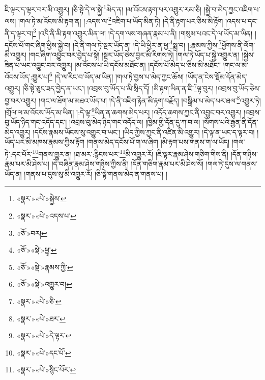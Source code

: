 ཇི་ལྟར་ད་ལྟར་བར་མི་འགྱུར། །ཅི་སྟེ་དེ་ལ་སྐྱེ་\footnote{«སྣར་»«པེ་»སྐྱེས་}མེད་ན། །མ་འོངས་རྟག་པར་འགྱུར་རམ་ཅི། །སྐྱེ་བ་མེད་ཀྱང་འཇིག་པ་ལས། །གལ་ཏེ་མ་འོངས་མི་རྟག་ན། །:འདས་ལ་\footnote{«སྣར་»«པེ་»འདས་པ་}འཇིག་པ་ཡོད་མིན་ཏེ། །དེ་ནི་རྟག་པར་ཅིས་མི་རྟོག །འདས་པ་དང་ནི་ད་ལྟར་བ།\footnote{«ཅོ་»བར།} །འདི་ནི་མི་རྟག་འགྱུར་མིན་ལ། །དེ་དག་ལས་གཞན་རྣམ་པ་ནི། །གསུམ་པའང་དེ་ལ་ཡོད་མ་ཡིན། །དངོས་པོ་གང་ཞིག་ཕྱིས་སྐྱེ་བ། །དེ་ནི་གལ་ཏེ་སྔར་ཡོད་ན། །དེ་ཡི་ཕྱིར་ན་ཕྱ་\footnote{«ཅོ་»«སྡེ་»ཕྱྭ་}སྨྲ་བ། །:རྣམས་ཀྱིས་\footnote{«ཅོ་»«སྡེ་»རྣམས་ཀྱི་}ཕྱོགས་ནི་ལོག་མི་འགྱུར། །གང་ཞིག་འབྱུང་བར་བྱེད་པ་སྟེ། །སྔར་ཡོད་ཅེས་བྱར་མི་རིགས་ཏེ། །གལ་ཏེ་ཡོད་པ་སྐྱེ་འགྱུར་ན། །སྐྱེས་ཟིན་པ་ཡང་འབྱུང་བར་འགྱུར། །མ་འོངས་པ་ཡི་དངོས་མཐོང་ན། །དངོས་པོ་མེད་པ་ཅིས་མི་མཐོང་། །གང་ལ་མ་འོངས་ཡོད་:གྱུར་པ།\footnote{«ཅོ་»«སྡེ་»འགྱུར་བ།} །དེ་ལ་རིང་བ་ཡོད་མ་ཡིན། །གལ་ཏེ་བྱས་པ་མེད་ཀྱང་ཆོས། །ཡོད་ན་ངེས་སྡོམ་དོན་མེད་འགྱུར། །ཅི་སྟེ་ཅུང་ཟད་བྱེད་ན་ཡང་། །འབྲས་བུ་ཡོད་པ་མི་སྲིད་དོ། །མི་རྟག་ཡིན་ན་ཇི་\footnote{«སྣར་»«པེ་»ཅི་}ལྟ་བུར། །འབྲས་བུ་ཡོད་ཅེས་བྱ་བར་འགྱུར། །གང་ལ་ཐོག་མ་མཐའ་ཡོད་པ། །དེ་ནི་འཇིག་རྟེན་མི་རྟག་བརྗོད། །བསྒྲིམ་པ་མེད་པར་ཐལ་\footnote{«སྣར་»«པེ་»ཐར་}འགྱུར་ཏེ། །གྲོལ་ལ་མ་འོངས་ཡོད་མ་ཡིན། །:དེ་ལྟ་\footnote{«སྣར་»«པེ་»དེ་ལྟར་}ཡིན་ན་ཆགས་མེད་པར། །འདོད་ཆགས་ཀྱང་ནི་འབྱུང་བར་འགྱུར། །འབྲས་བུ་ཡོད་ཉིད་གང་འདོད་དང་། །འབྲས་བུ་མེད་ཉིད་གང་འདོད་ལ། །ཁྱིམ་གྱི་དོན་དུ་ཀ་བ་ལ། །སོགས་པའི་རྒྱན་ནི་དོན་མེད་འགྱུར། །དངོས་རྣམས་ཡོངས་སུ་འགྱུར་བ་ཡང་། །ཡིད་ཀྱིས་ཀྱང་ནི་འཛིན་མི་འགྱུར། །དེ་ལྟ་ན་ཡང་ད་ལྟར་བ། །ཡོད་པར་མི་མཁས་རྣམས་ཀྱིས་རྟོག །གནས་མེད་དངོས་པོ་ག་ལ་ཞིག །མི་རྟག་པས་གནས་ག་ལ་ཡོད། །གལ་ཏེ་:དང་པོར་\footnote{«སྣར་»«པེ་»དང་པོ་}གནས་གྱུར་ན། །ཐ་མར་:རྙིངས་པར་\footnote{«སྣར་»«པེ་»སྙིང་པོར་}མི་འགྱུར་རོ། །ཇི་ལྟར་རྣམ་ཤེས་གཅིག་གིས་ནི། །དོན་གཉིས་རྣམ་པར་མི་ཤེས་པ། །དེ་བཞིན་རྣམ་ཤེས་གཉིས་ཀྱིས་ནི། །དོན་གཅིག་རྣམ་པར་མི་ཤེས་སོ། །གལ་ཏེ་དུས་ལ་གནས་ཡོད་ན། །གནས་པ་དུས་སུ་མི་འགྱུར་རོ། །ཅི་སྟེ་གནས་མེད་ན་གནས་པ། །
